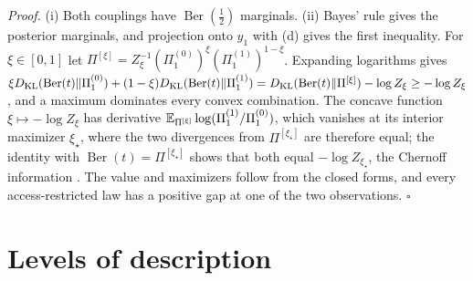 \noindent\emph{Proof.}
(i) Both couplings have $\operatorname{Ber}(\tfrac12)$ marginals. (ii) Bayes' rule gives the posterior
marginals, and projection onto $y_1$ with (d) gives the first inequality. For
$\xi\in[0,1]$ let $\Pi^{[\xi]}=Z_\xi^{-1}(\Pi_1^{(0)})^\xi(\Pi_1^{(1)})^{1-\xi}$. Expanding logarithms gives
$\xi D_{\mathrm{KL}}(\operatorname{Ber}(t)\Vert\Pi_1^{(0)})+(1-\xi)D_{\mathrm{KL}}(\operatorname{Ber}(t)\Vert\Pi_1^{(1)})
=D_{\mathrm{KL}}(\operatorname{Ber}(t)\Vert\Pi^{[\xi]})-\log Z_\xi\geq-\log Z_\xi$, and a maximum dominates every convex
combination. The concave function $\xi\mapsto-\log Z_\xi$ has derivative
$\mathbb E_{\Pi^{[\xi]}}\log(\Pi_1^{(1)}/\Pi_1^{(0)})$, which vanishes at its interior maximizer $\xi_\star$, where
the two divergences from $\Pi^{[\xi_\star]}$ are therefore equal; the identity with
$\operatorname{Ber}(t)=\Pi^{[\xi_\star]}$ shows that both equal $-\log Z_{\xi_\star}$, the Chernoff
information \citep[Section~11.9]{CoverThomas2006}. The value and maximizers follow from the closed forms,
and every access-restricted law has a positive gap at one of the two observations. \hfill$\square$

\section{Levels of description}
\label{sec:prob-levels}

